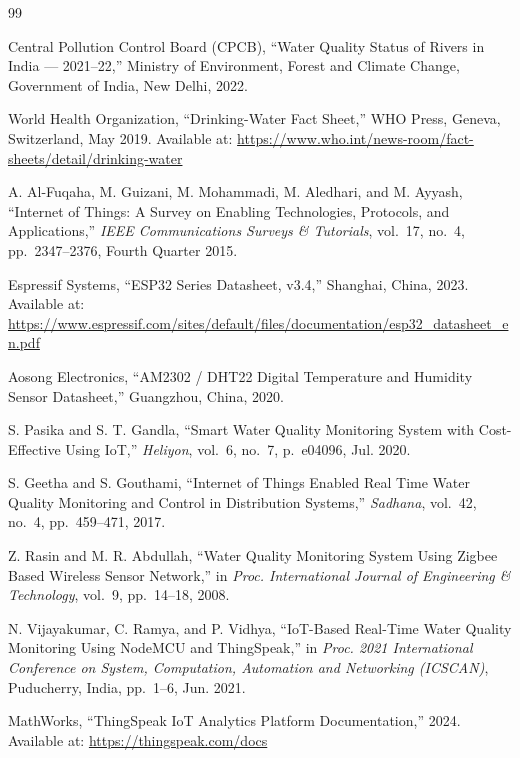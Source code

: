 \documentclass[12pt,a4paper]{article}
\begin{document}
\begin{thebibliography}{99}

Central Pollution Control Board (CPCB),
``Water Quality Status of Rivers in India --- 2021--22,''
Ministry of Environment, Forest and Climate Change, Government of India,
New Delhi, 2022.

World Health Organization,
``Drinking-Water Fact Sheet,''
WHO Press, Geneva, Switzerland, May 2019.
Available at: \url{https://www.who.int/news-room/fact-sheets/detail/drinking-water}

A. Al-Fuqaha, M. Guizani, M. Mohammadi, M. Aledhari, and M. Ayyash,
``Internet of Things: A Survey on Enabling Technologies, Protocols, and Applications,''
\textit{IEEE Communications Surveys \& Tutorials}, vol.~17, no.~4,
pp.~2347--2376, Fourth Quarter 2015.

Espressif Systems,
``ESP32 Series Datasheet, v3.4,''
Shanghai, China, 2023.
Available at: \url{https://www.espressif.com/sites/default/files/documentation/esp32_datasheet_en.pdf}

Aosong Electronics,
``AM2302 / DHT22 Digital Temperature and Humidity Sensor Datasheet,''
Guangzhou, China, 2020.

S. Pasika and S. T. Gandla,
``Smart Water Quality Monitoring System with Cost-Effective Using IoT,''
\textit{Heliyon}, vol.~6, no.~7, p.~e04096, Jul. 2020.

S. Geetha and S. Gouthami,
``Internet of Things Enabled Real Time Water Quality Monitoring and Control in Distribution Systems,''
\textit{Sadhana}, vol.~42, no.~4, pp.~459--471, 2017.

Z. Rasin and M. R. Abdullah,
``Water Quality Monitoring System Using Zigbee Based Wireless Sensor Network,''
in \textit{Proc. International Journal of Engineering \& Technology}, vol.~9, pp.~14--18, 2008.

N. Vijayakumar, C. Ramya, and P. Vidhya,
``IoT-Based Real-Time Water Quality Monitoring Using NodeMCU and ThingSpeak,''
in \textit{Proc. 2021 International Conference on System, Computation, Automation and Networking (ICSCAN)},
Puducherry, India, pp.~1--6, Jun. 2021.

MathWorks,
``ThingSpeak IoT Analytics Platform Documentation,''
2024. Available at: \url{https://thingspeak.com/docs}


\end{thebibliography}
\end{document}
